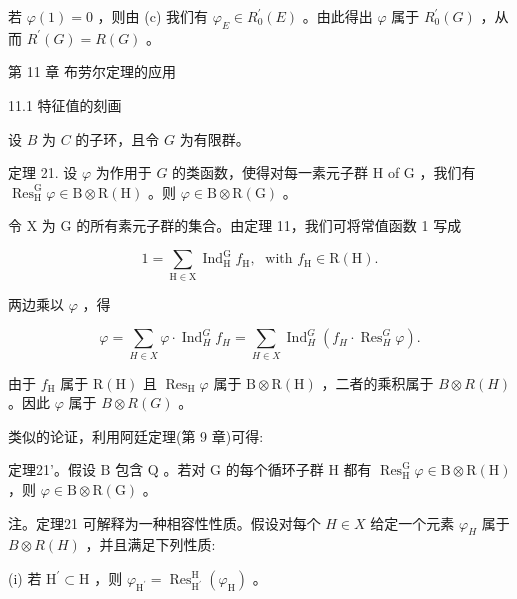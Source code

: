 \documentclass[10pt]{article}
\begin{document}
若 \(\varphi \left( 1\right)  = 0\) ，则由 (c) 我们有 \({\varphi }_{E} \in  {R}_{0}^{\prime }\left( E\right)\) 。由此得出 \(\varphi\) 属于 \({R}_{0}^{\prime }\left( G\right)\) ，从而 \({R}^{\prime }\left( G\right)  = R\left( G\right)\) 。

第 11 章 布劳尔定理的应用

11.1 特征值的刻画

设 \(B\) 为 \(C\) 的子环，且令 \(G\) 为有限群。

定理 21. 设 \(\varphi\) 为作用于 \(G\) 的类函数，使得对每一素元子群 \(\mathrm{H}\) of \(\mathrm{G}\) ，我们有 \({\operatorname{Res}}_{\mathrm{H}}^{\mathrm{G}}\varphi  \in  \mathrm{B} \otimes  \mathrm{R}\left( \mathrm{H}\right)\) 。则 \(\varphi  \in  \mathrm{B} \otimes  \mathrm{R}\left( \mathrm{G}\right)\) 。

令 \(\mathrm{X}\) 为 G 的所有素元子群的集合。由定理 11，我们可将常值函数 1 写成

\[
1 = \mathop{\sum }\limits_{{\mathrm{H} \in  \mathrm{X}}}{\operatorname{Ind}}_{\mathrm{H}}^{\mathrm{G}}{f}_{\mathrm{H}},\;\text{ with }{f}_{\mathrm{H}} \in  \mathrm{R}\left( \mathrm{H}\right) .
\]

两边乘以 \(\varphi\) ，得

\[
\varphi  = \mathop{\sum }\limits_{{H \in  X}}\varphi  \cdot  {\operatorname{Ind}}_{H}^{G}{f}_{H} = \mathop{\sum }\limits_{{H \in  X}}{\operatorname{Ind}}_{H}^{G}\left( {{f}_{H} \cdot  {\operatorname{Res}}_{H}^{G}\varphi }\right) .
\]

由于 \({f}_{\mathrm{H}}\) 属于 \(\mathrm{R}\left( \mathrm{H}\right)\) 且 \({\operatorname{Res}}_{\mathrm{H}}\varphi\) 属于 \(\mathrm{B} \otimes  \mathrm{R}\left( \mathrm{H}\right)\) ，二者的乘积属于 \(B \otimes  R\left( H\right)\) 。因此 \(\varphi\) 属于 \(B \otimes  R\left( G\right)\) 。

类似的论证，利用阿廷定理(第 9 章)可得:

定理21’。假设 \(\mathrm{B}\) 包含 \(\mathrm{Q}\) 。若对 \(\mathrm{G}\) 的每个循环子群 \(\mathrm{H}\) 都有 \({\operatorname{Res}}_{\mathrm{H}}^{\mathrm{G}}\varphi  \in  \mathrm{B} \otimes  \mathrm{R}\left( \mathrm{H}\right)\) ，则 \(\varphi  \in  \mathrm{B} \otimes  \mathrm{R}\left( \mathrm{G}\right)\) 。

注。定理21 可解释为一种相容性性质。假设对每个 \(H \in  X\) 给定一个元素 \({\varphi }_{H}\) 属于 \(B \otimes  R\left( H\right)\) ，并且满足下列性质:

(i) 若 \({\mathrm{H}}^{\prime } \subset  \mathrm{H}\) ，则 \({\varphi }_{{\mathrm{H}}^{\prime }} = {\operatorname{Res}}_{{\mathrm{H}}^{\prime }}^{\mathrm{H}}\left( {\varphi }_{\mathrm{H}}\right)\) 。
\end{document}
